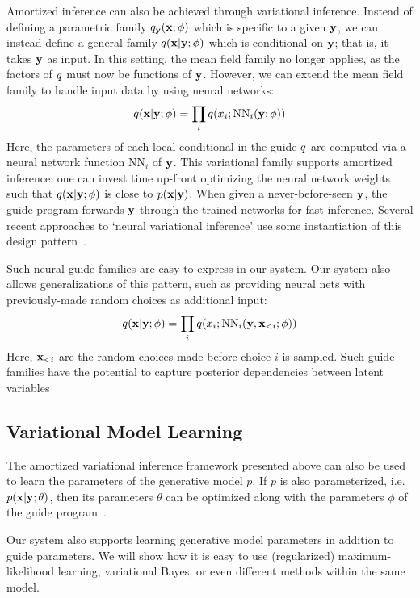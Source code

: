 Amortized inference can also be achieved through variational inference.
Instead of defining a parametric family $q_{\mathbf{y}}(\mathbf{x} ; \phi)$ which is specific to a given $\mathbf{y}$, we can instead define a general family $q(\mathbf{x} | \mathbf{y} ; \phi)$ which is conditional on $\mathbf{y}$; that is, it takes $\mathbf{y}$ as input.
In this setting, the mean field family no longer applies, as the factors of $q$ must now be functions of $\mathbf{y}$.
However, we can extend the mean field family to handle input data by using neural networks:
\begin{equation*}
q(\mathbf{x} | \mathbf{y} ; \phi) = \prod_i q(x_i ; \text{NN}_i(\mathbf{y} ; \phi))
\end{equation*}
Here, the parameters of each local conditional in the guide $q$ are computed via a neural network function $\text{NN}_i$ of $\mathbf{y}$.
This variational family supports amortized inference: one can invest time up-front optimizing the neural network weights such that $q(\mathbf{x} | \mathbf{y} ; \phi)$ is close to $p(\mathbf{x} | \mathbf{y})$. When given a never-before-seen $\mathbf{y}$, the guide program forwards $\mathbf{y}$ through the trained networks for fast inference.
Several recent approaches to `neural variational inference' use some instantiation of this design pattern~\cite{NVIL,DLGM,AEVB}.

Such neural guide families are easy to express in our system. Our system also allows generalizations of this pattern, such as providing neural nets with previously-made random choices as additional input:
\begin{equation*}
q(\mathbf{x} | \mathbf{y} ; \phi) = \prod_i q(x_i ; \text{NN}_i(\mathbf{y}, \mathbf{x}_{<i} ; \phi))
\end{equation*}
Here, $\mathbf{x}_{<i}$ are the random choices made before choice $i$ is sampled. Such guide families have the potential to capture posterior dependencies between latent variables

\subsection{Variational Model Learning}

The amortized variational inference framework presented above can also be used to learn the parameters of the generative model $p$. If $p$ is also parameterized, i.e. $p(\mathbf{x} | \mathbf{y} ; \theta)$, then its parameters $\theta$ can be optimized along with the parameters $\phi$ of the guide program~\cite{NVIL,DLGM,AEVB}.

Our system also supports learning generative model parameters in addition to guide parameters.
We will show how it is easy to use (regularized) maximum-likelihood learning, variational Bayes, or even different methods within the same model.

